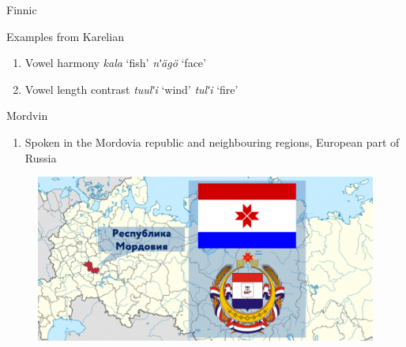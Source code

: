 \documentclass[10 pt, handout]{beamer}
\begin{document}
\begin{frame}{Finnic}

	Examples from Karelian \parencite{ryagoev1993}
	\begin{enumerate}[$\gg$]
		\item Vowel harmony
			\pex 
				\a \emph{kala} \hfill `fish'
				\a \emph{nʹ{\"a}g{\"o}} \hfill `face'
			\xe
		\item Vowel length contrast
			\pex
				\a \emph{tuulʹi} \hfill `wind'
				\a \emph{tulʹi} \hfill `fire'
			\xe
	\end{enumerate}

\end{frame}

\begin{frame}{Mordvin}

	\begin{enumerate}[$\gg$]
		\item Spoken in the Mordovia republic and neighbouring regions, European part of Russia
	\end{enumerate}

	\begin{figure}[H]
		\centering
		\includegraphics[scale=.4]{mordovia-map}
	\end{figure}

\end{frame}
\end{document}
